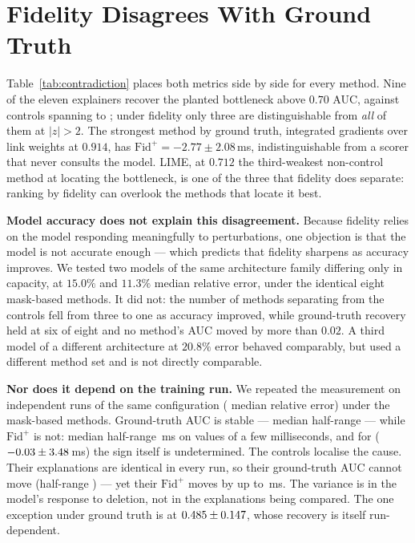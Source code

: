 \documentclass[conference]{IEEEtran}
\begin{document}
\section{Fidelity Disagrees With Ground Truth}
\label{sec:fidelity}


Table~\ref{tab:contradiction} places both metrics side by side for every
method. Nine of the eleven explainers recover the planted
bottleneck above $0.70$ AUC, against \NControls{} controls spanning
\GTRandom{} to \GTShortPath; under
fidelity only three are distinguishable from \emph{all} of them at $|z|>2$.
The strongest method by ground
truth, integrated gradients over link weights at $0.914$, has
$\mathrm{Fid}^{+} = -2.77 \pm 2.08$\,ms, indistinguishable from a scorer that
never consults the model. LIME, at $0.712$ the third-weakest non-control method at locating the
bottleneck, is one of the three that fidelity does separate: ranking by
fidelity can overlook the methods that locate it best.

\textbf{Model accuracy does not explain this disagreement.} Because fidelity relies on the model responding meaningfully to perturbations,
one objection is that the model is not accurate enough --- which predicts that
fidelity sharpens as accuracy improves. We tested two models of the same
architecture family differing only in capacity, at $15.0\%$ and $11.3\%$ median
relative error, under the identical eight mask-based methods. It did not: the
number of methods separating from the controls fell from three to one as
accuracy improved, while ground-truth recovery held at six of eight and no
method's AUC moved by more than $0.02$. A third model of a different
architecture at $20.8\%$ error behaved comparably, but used a different method
set and is not directly comparable.

\textbf{Nor does it depend on the training run.} We repeated the measurement
on \SeedNWord{} independent runs of the same configuration (\SeedQualities{}
median relative error) under the \SeedNMethodsWord{} mask-based methods. Ground-truth AUC
is stable --- median half-range \SeedGTSpread{} --- while
$\mathrm{Fid}^{+}$ is not: median half-range
\SeedFidSpread\,ms on values of a few milliseconds, and for \SeedFlipName{}
($-0.03 \pm 3.48$\,ms) the sign itself is undetermined. The
controls localise the cause. Their explanations are identical in every run, so
their ground-truth AUC cannot move (half-range \SeedCtrlGTHalf) --- yet their
$\mathrm{Fid}^{+}$ moves by up to \SeedCtrlFidHalf\,ms. The variance is in the
model's response to deletion, not in the explanations being compared. The one
exception under ground truth is \SeedWorstGTName{} at $0.485 \pm
0.147$, whose recovery is itself run-dependent.
\end{document}

